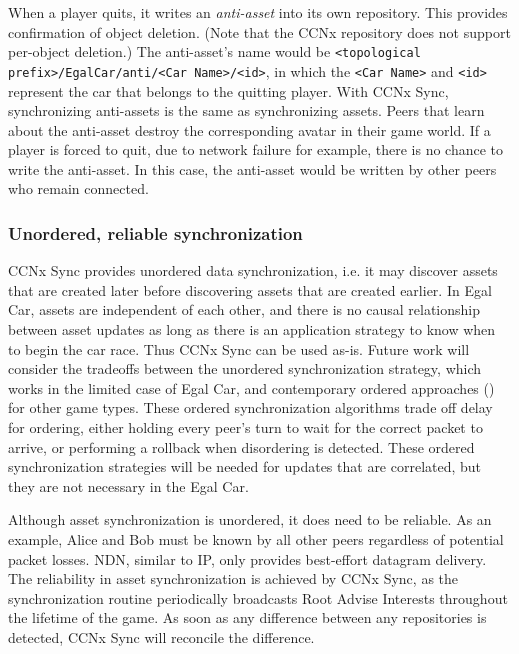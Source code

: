 \documentclass{article}
\begin{document}
When a player quits, it writes an \emph{anti-asset} into its own repository. This provides confirmation of object deletion.  (Note that the CCNx repository does not support per-object deletion.)  The anti-asset's name would be \texttt{<topological prefix>/EgalCar/anti/<Car Name>/<id>}, in which the \texttt{<Car Name>} and \texttt{<id>} represent the car that belongs to the quitting player. With CCNx Sync, synchronizing anti-assets is the same as synchronizing assets. Peers that learn about the anti-asset destroy the corresponding avatar in their game world. If a player is forced to quit, due to network failure for example, there is no chance to write the anti-asset. In this case, the anti-asset would be written by other peers who remain connected. 

\subsubsection{Unordered, reliable synchronization}

CCNx Sync provides unordered data synchronization, i.e. it may discover assets that are created later before discovering assets that are created earlier.  In Egal Car, assets are independent of each other, and there is no causal relationship between asset updates as long as there is an application strategy to know when to begin the car race. Thus CCNx Sync can be used as-is. 
Future work will consider the tradeoffs between the unordered synchronization strategy, which works in the limited case of Egal Car, and contemporary ordered approaches (\cite{Chandy, Bryant, Flockstep, Csync, Doptbkt}) for other game types. These ordered synchronization algorithms trade off delay for ordering, either holding every peer's turn to wait for the correct packet to arrive, or performing a rollback when disordering is detected. These ordered synchronization strategies will be needed for updates that are correlated, but they are not necessary in the Egal Car. 

Although asset synchronization is unordered, it does need to be reliable. As an example, Alice and Bob must be known by all other peers regardless of potential packet losses.  NDN, similar to IP, only provides best-effort datagram delivery. The reliability in asset synchronization is achieved by CCNx Sync, as the synchronization routine periodically broadcasts Root Advise Interests throughout the lifetime of the game.  As soon as any difference between any repositories is detected, 
CCNx Sync will reconcile the difference.
\end{document}
